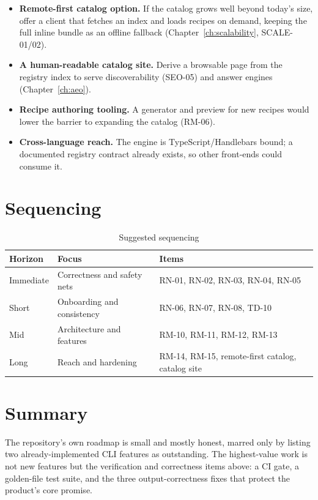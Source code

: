 \begin{itemize}
  \item \textbf{Remote-first catalog option.} If the catalog grows well beyond
        today's size, offer a client that fetches an index and loads recipes on
        demand, keeping the full inline bundle as an offline fallback
        (Chapter~\ref{ch:scalability}, SCALE-01/02).
  \item \textbf{A human-readable catalog site.} Derive a browsable page from the
        registry index to serve discoverability (SEO-05) and answer engines
        (Chapter~\ref{ch:aeo}).
  \item \textbf{Recipe authoring tooling.} A generator and preview for new
        recipes would lower the barrier to expanding the catalog (RM-06).
  \item \textbf{Cross-language reach.} The engine is TypeScript/Handlebars bound;
        a documented registry contract already exists, so other front-ends could
        consume it.
\end{itemize}

\section{Sequencing}

\begin{table}[H]
\centering
\caption{Suggested sequencing}
\begin{tabular}{@{}L{5.6cm}L{4.2cm}L{4.4cm}@{}}
\toprule
\textbf{Horizon} & \textbf{Focus} & \textbf{Items} \\
\midrule
Immediate & Correctness and safety nets & RN-01, RN-02, RN-03, RN-04, RN-05 \\
Short & Onboarding and consistency & RN-06, RN-07, RN-08, TD-10 \\
Mid & Architecture and features & RM-10, RM-11, RM-12, RM-13 \\
Long & Reach and hardening & RM-14, RM-15, remote-first catalog, catalog site \\
\bottomrule
\end{tabular}
\end{table}

\section{Summary}

The repository's own roadmap is small and mostly honest, marred only by listing
two already-implemented CLI features as outstanding. The highest-value work is
not new features but the verification and correctness items above: a CI gate, a
golden-file test suite, and the three output-correctness fixes that protect the
product's core promise.
